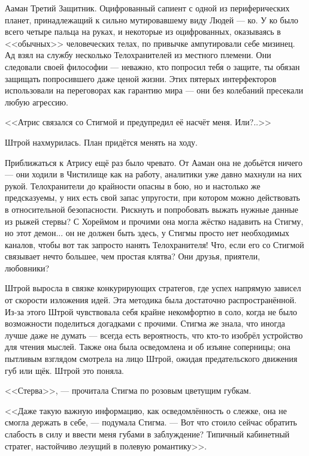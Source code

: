 Ааман Третий Защитник.
Оцифрованный сапиент с одной из периферических планет, принадлежащий к сильно мутировавшему виду Людей --- ко. %
У ко было всего четыре пальца на руках, и некоторые из оцифрованных, оказываясь в <<обычных>> человеческих телах, по привычке ампутировали себе мизинец.
Ад взял на службу несколько Телохранителей из местного племени.
Они следовали своей философии --- неважно, кто попросил тебя о защите, ты обязан защищать попросившего даже ценой жизни.
Этих пятерых интерфекторов использовали на переговорах как гарантию мира --- они без колебаний пресекали любую агрессию.

<<Атрис связался со Стигмой и предупредил её насчёт меня.
Или?..>>

Штрой нахмурилась.
План придётся менять на ходу.

Приближаться к Атрису ещё раз было чревато.
От Ааман она не добьётся ничего --- они ходили в Чистилище как на работу, аналитики уже давно махнули на них рукой.
Телохранители до крайности опасны в бою, но и настолько же предсказуемы, у них есть свой запас упругости, при котором можно действовать в относительной безопасности.
Рискнуть и попробовать выжать нужные данные из рыжей стервы?
С Хореймом и прочими она могла жёстко надавить на Стигму, но этот демон... он не должен быть здесь, у Стигмы просто нет необходимых каналов, чтобы вот так запросто нанять Телохранителя!
Что, если его со Стигмой связывает нечто большее, чем простая клятва?
Они друзья, приятели, любовники?

Штрой выросла в связке конкурирующих стратегов, где успех напрямую зависел от скорости изложения идей.
Эта методика была достаточно распространённой.
Из-за этого Штрой чувствовала себя крайне некомфортно в соло, когда не было возможности поделиться догадками с прочими.
Стигма же знала, что иногда лучше даже не думать --- всегда есть вероятность, что кто-то изобрёл устройство для чтения мыслей.
Также она была осведомлена и об изъяне соперницы;
она пытливым взглядом смотрела на лицо Штрой, ожидая предательского движения губ или щёк.
Штрой это поняла.

<<Стерва>>, --- прочитала Стигма по розовым цветущим губкам.

<<Даже такую важную информацию, как осведомлённость о слежке, она не смогла держать в себе, --- подумала Стигма.
--- Вот что стоило сейчас обратить слабость в силу и ввести меня губами в заблуждение?
Типичный кабинетный стратег, настойчиво лезущий в полевую романтику>>.

\textspace

